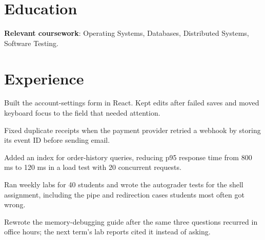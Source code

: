 \documentclass{resume}
\begin{document}

\section{Education}

\begin{jobduties}
  \item \textbf{Relevant coursework}: Operating Systems, Databases, Distributed Systems, Software Testing.
\end{jobduties}

\section{Experience}

\begin{jobduties}
  \item Built the account-settings form in React. Kept edits after failed saves and moved keyboard focus to the field that needed attention.
  \item Fixed duplicate receipts when the payment provider retried a webhook by storing its event ID before sending email.
  \item Added an index for order-history queries, reducing p95 response time from 800 ms to 120 ms in a load test with 20 concurrent requests.
\end{jobduties}

\begin{jobduties}
  \item Ran weekly labs for 40 students and wrote the autograder tests for the shell assignment, including the pipe and redirection cases students most often got wrong.
  \item Rewrote the memory-debugging guide after the same three questions recurred in office hours; the next term's lab reports cited it instead of asking.
\end{jobduties}
\end{document}

